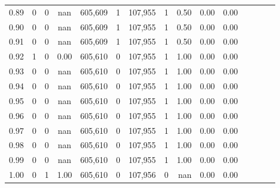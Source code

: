 \begin{tabular}{rrrcrrrrrrrrrrr}
0.89 &        0 &       0 &                                        nan &  605,609 &        1 &  107,955 &        1 &  0.50 &  0.00 &                         0.00 \\
0.90 &        0 &       0 &                                        nan &  605,609 &        1 &  107,955 &        1 &  0.50 &  0.00 &                         0.00 \\
0.91 &        0 &       0 &                                        nan &  605,609 &        1 &  107,955 &        1 &  0.50 &  0.00 &                         0.00 \\
0.92 &        1 &       0 &                                       0.00 &  605,610 &        0 &  107,955 &        1 &  1.00 &  0.00 &                         0.00 \\
0.93 &        0 &       0 &                                        nan &  605,610 &        0 &  107,955 &        1 &  1.00 &  0.00 &                         0.00 \\
0.94 &        0 &       0 &                                        nan &  605,610 &        0 &  107,955 &        1 &  1.00 &  0.00 &                         0.00 \\
0.95 &        0 &       0 &                                        nan &  605,610 &        0 &  107,955 &        1 &  1.00 &  0.00 &                         0.00 \\
0.96 &        0 &       0 &                                        nan &  605,610 &        0 &  107,955 &        1 &  1.00 &  0.00 &                         0.00 \\
0.97 &        0 &       0 &                                        nan &  605,610 &        0 &  107,955 &        1 &  1.00 &  0.00 &                         0.00 \\
0.98 &        0 &       0 &                                        nan &  605,610 &        0 &  107,955 &        1 &  1.00 &  0.00 &                         0.00 \\
0.99 &        0 &       0 &                                        nan &  605,610 &        0 &  107,955 &        1 &  1.00 &  0.00 &                         0.00 \\
1.00 &        0 &       1 &                                       1.00 &  605,610 &        0 &  107,956 &        0 &   nan &  0.00 &                         0.00 \\
\bottomrule
\end{tabular}
